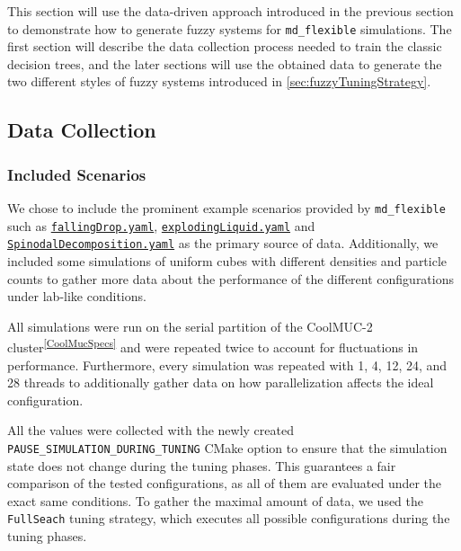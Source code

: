 This section will use the data-driven approach introduced in the previous section to demonstrate how to generate fuzzy systems for \texttt{md\_flexible} simulations. The first section will describe the data collection process needed to train the classic decision trees, and the later sections will use the obtained data to generate the two different styles of fuzzy systems introduced in \autoref{sec:fuzzyTuningStrategy}.

\subsection{Data Collection}

\subsubsection{Included Scenarios}

We chose to include the prominent example scenarios provided by \texttt{md\_flexible} such as \href{https://github.com/AutoPas/AutoPas/blob/c25dc770f173ff160630d7e58f59b38e277032a1/examples/md-flexible/input/fallingDrop.yaml}{\color{blue}\texttt{fallingDrop.yaml}}, \href{https://github.com/AutoPas/AutoPas/blob/c25dc770f173ff160630d7e58f59b38e277032a1/examples/md-flexible/input/explodingLiquid.yaml}{\color{blue} \texttt{explodingLiquid.yaml}} and \href{https://github.com/AutoPas/AutoPas/blob/c25dc770f173ff160630d7e58f59b38e277032a1/examples/md-flexible/input/SpinodalDecomposition.yaml}{\color{blue} \texttt{SpinodalDecomposition.yaml}} as the primary source of data. Additionally, we included some simulations of uniform cubes with different densities and particle counts to gather more data about the performance of the different configurations under lab-like conditions.

All simulations were run on the serial partition of the CoolMUC-2 cluster\textsuperscript{\ref{CoolMucSpecs}} and were repeated twice to account for fluctuations in performance. Furthermore, every simulation was repeated with 1, 4, 12, 24, and 28 threads to additionally gather data on how parallelization affects the ideal configuration.

All the values were collected with the newly created \texttt{PAUSE\_SIMULATION\_DURING\_TUNING} CMake option to ensure that the simulation state does not change during the tuning phases. This guarantees a fair comparison of the tested configurations, as all of them are evaluated under the exact same conditions. To gather the maximal amount of data, we used the \texttt{FullSeach} tuning strategy, which executes all possible configurations during the tuning phases.


